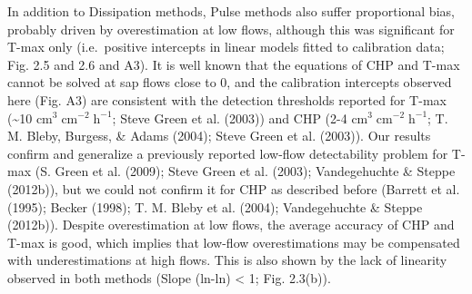 \documentclass[11pt,twoside]{reedthesis}
\begin{document}
In addition to Dissipation methods, Pulse methods also suffer
proportional bias, probably driven by overestimation at low flows,
although this was significant for T-max only (i.e.~positive intercepts
in linear models fitted to calibration data; Fig. 2.5 and 2.6 and A3).
It is well known that the equations of CHP and T-max cannot be solved at
sap flows close to 0, and the calibration intercepts observed here (Fig.
A3) are consistent with the detection thresholds reported for T-max
(\textasciitilde{}10 \(\text{cm}^3\; \text{cm}^{-2}\; \text{h}^{-1}\);
Steve Green et al. (2003)) and CHP (2-4
\(\text{cm}^3\; \text{cm}^{-2}\; \text{h}^{-1}\); T. M. Bleby, Burgess,
\& Adams (2004); Steve Green et al. (2003)). Our results confirm and
generalize a previously reported low-flow detectability problem for
T-max (S. Green et al. (2009); Steve Green et al. (2003); Vandegehuchte
\& Steppe (2012b)), but we could not confirm it for CHP as described
before (Barrett et al. (1995); Becker (1998); T. M. Bleby et al. (2004);
Vandegehuchte \& Steppe (2012b)). Despite overestimation at low flows,
the average accuracy of CHP and T-max is good, which implies that
low-flow overestimations may be compensated with underestimations at
high flows. This is also shown by the lack of linearity observed in both
methods (Slope (ln-ln) \textless{} 1; Fig. 2.3(b)).\par
\end{document}
